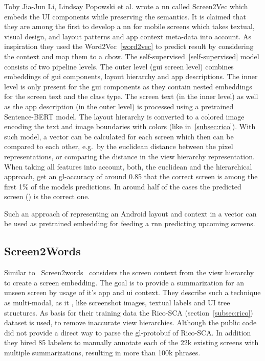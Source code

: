 Toby Jia-Jun Li, Lindsay Popowski et al. \cite{li2021screen2vec} wrote a \gls{nn} called Screen2Vec which embeds the UI components while preserving the semantics.
It is claimed that they are among the first to develop a \gls{nn} for mobile screens which takes textual, visual design, and layout patterns and app context meta-data into account.
As inspiration they used the Word2Vec~\ref{word2vec} to predict result by considering the context and map them to a \gls{cbow}.
The self-supervised~\ref{self-supervised} model consists of two pipeline levels.
The outer level (\gls{gui} screen level) combines embeddings of \gls{gui} components, layout hierarchy and app descriptions.
The inner level is only present for the \gls{gui} components as they contain nested embeddings for the screen text and the class type.
The screen text (in the inner level) as well as the app description (in the outer level) is processed using a pretrained Sentence-BERT model.
The layout hierarchy is converted to a colored image encoding the text and image boundaries with colors (like in~\ref{subsec:rico}).
With such model, a vector can be calculated for each screen which then can be compared to each other, e.g.\ by the euclidean distance between the pixel representations, or comparing the distance in the view hierarchy representation.
When taking all features into account, both, the euclidean and the hierarchical approach, get an \gls{gl-accuracy} of around 0.85 that the correct screen is among the first 1\% of the models predictions.
In around half of the cases the predicted screen () is the correct one.

Such an approach of representing an Android layout and context in a vector can be used as pretrained embedding for feeding a \gls{rnn} predicting upcoming screens.

\subsection{Screen2Words}
\label{subsec:screen2words}

Similar to~\cite{li2021screen2vec} Screen2words~\cite{wang2021screen2words} considers the screen context from the view hierarchy to create a screen embedding.
The goal is to provide a summarization for an unseen screen by usage of it's app and \gls{ui} context.
They describe such a technique as multi-modal, as it , like screenshot images, textual labels and UI tree structures.
As basis for their training data the Rico-SCA (section~\ref{subsec:rico}) dataset is used, to remove inaccurate view hierarchies.
Although the public code did not provide a direct way to parse the \Gls{gl-protobuf} of Rico-SCA.
In addition they hired 85 labelers to manually annotate each of the 22k existing screens with multiple summarizations, resulting in more than 100k phrases.

